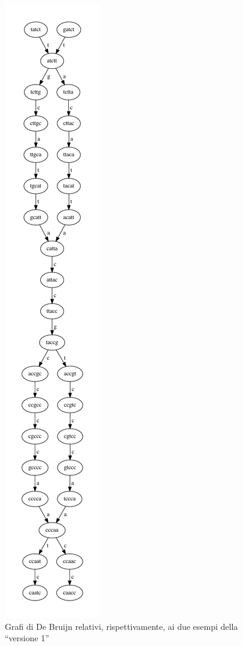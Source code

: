 \documentclass[a4paper,12pt, oneside]{book}
\begin{document}
\begin{figure}
  \includegraphics[scale = 0.38]{img/mutns.pdf}
  \caption{Grafi di De Bruijn relativi, rispettivamente, ai due esempi della
    ``versione 1''}
  \label{fig:dbg}
\end{figure}
\end{document}
